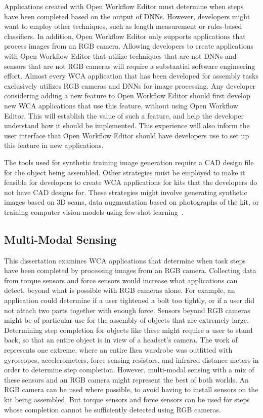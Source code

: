Applications created with Open Workflow Editor must determine when steps have
been completed based on the output of DNNs.
However, developers might want to employ other techniques, such as length
measurement or rules-based classifiers.
In addition, Open Workflow Editor only supports applications that process images
from an RGB camera.
Allowing developers to create applications with Open Workflow Editor that
utilize techniques that are not DNNs and sensors that are not RGB cameras will
require a substantial software engineering effort.
Almost every WCA application that has been developed for assembly tasks
exclusively utilizes RGB cameras and DNNs for image processing.
Any developer considering adding a new feature to Open Workflow Editor should
first develop new WCA applications that use this feature, without using Open
Workflow Editor.
This will establish the value of such a feature, and help the
developer understand how it should be implemented.
This experience will also inform the user interface that Open Workflow Editor
should have developers use to set up this feature in new applications.

The tools used for synthetic training image generation require a CAD design file
for the object being assembled.
Other strategies must be employed to make it feasible for developers to create
WCA applications for kits that the developers do not have CAD designs for.
These strategies might involve generating synthetic images based on 3D scans,
data augmentation based on photographs of the kit, or training computer vision
models using few-shot learning~\cite{fewshot}.

\subsection{Multi-Modal Sensing}

This dissertation examines WCA applications that determine when task steps have
been completed by processing images from an RGB camera.
Collecting data from torque sensors and force sensors would increase what
applications can detect, beyond what is possible with RGB cameras alone.
For example, an application could determine if a user tightened a bolt too
tightly, or if a user did not attach two parts together with enough force.
Sensors beyond RGB cameras might be of particular use for the assembly of
objects that are extremely large.
Determining step completion for objects like these might require a user to stand
back, so that an entire object is in view of a headset's camera.
The work of \citet{sensors} represents one extreme, where an entire Ikea
wardrobe was outfitted with gyroscopes, accelerometers, force sensing resistors,
and infrared distance meters in order to determine step completion.
However, multi-modal sensing with a mix of these sensors and an RGB camera might
represent the best of both worlds.
An RGB camera can be used where possible, to avoid having to install sensors on
the kit being assembled.
But torque sensors and force sensors can be used for steps whose completion
cannot be  sufficiently detected using RGB cameras.

